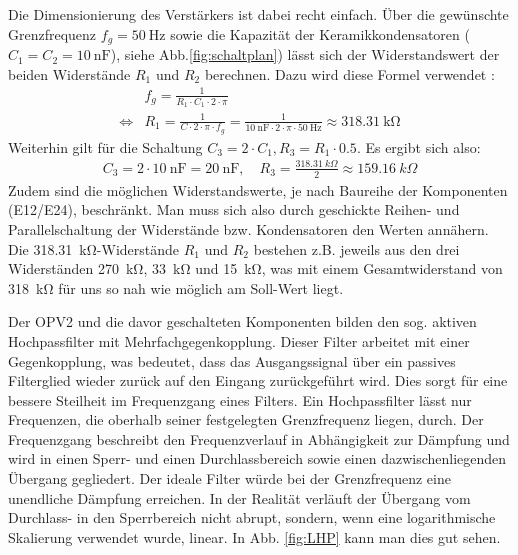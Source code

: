 \documentclass[10pt]{article}
\begin{document}
Die Dimensionierung des Verstärkers ist dabei recht einfach. 
Über die gewünschte Grenzfrequenz $f_g = \SI{50}{\hertz}$ sowie die Kapazität der Keramikkondensatoren ($C_1 = C_2 = \SI{10}{\nano\farad}$), siehe Abb.\ref{fig:schaltplan}) lässt sich der Widerstandswert der beiden Widerstände $R_1$ und $R_2$ berechnen.
Dazu wird diese Formel verwendet \cite{Notchfilter,Thomson}: %
%
\begin{align*}
                &f_g = \frac{1}{R_1 \cdot C_1 \cdot 2 \cdot \pi} \\
\Leftrightarrow &R_1 = \frac{1}{C \cdot 2 \cdot \pi \cdot f_g } = \frac{1}{\SI{10}{\nano\farad} \cdot 2 \cdot \pi \cdot \SI{50}{\hertz}} \approx \SI{318.31}{\kohm}     
\end{align*}
%
Weiterhin gilt für die Schaltung $C_3 = 2 \cdot C_1, R_3 = {R_1} \cdot 0.5$. Es ergibt sich also:
%
\begin{align*}
    C_3 = 2 \cdot \SI{10}{\nano\farad} = \SI{20}{\nano\farad}, \quad
    R_3 = \frac{\SI{318.31}{kΩ}}{2} \approx \SI{159.16}{kΩ} 
\end{align*}
Zudem sind die möglichen Widerstandswerte, je nach Baureihe der Komponenten (E12/E24), beschränkt. 
Man muss sich also durch geschickte Reihen- und Parallelschaltung der Widerstände bzw. Kondensatoren den Werten annähern. 
Die \SI{318,31}{kΩ}-Widerstände $R_1$ und $R_2$ bestehen z.B. jeweils aus den drei Widerständen \SI{270}{kΩ}, \SI{33}{kΩ} und \SI{15}{kΩ}, was mit einem Gesamtwiderstand von \SI{318}{\kohm} für uns so nah wie möglich am Soll-Wert liegt.

Der OPV2 und die davor geschalteten Komponenten bilden den sog. aktiven Hochpassfilter mit Mehrfachgegenkopplung. 
Dieser Filter arbeitet mit einer Gegenkopplung, was bedeutet, dass das Ausgangssignal über ein passives Filterglied wieder zurück auf den Eingang zurückgeführt wird. 
Dies sorgt für eine bessere Steilheit im Frequenzgang eines Filters. 
Ein Hochpassfilter lässt nur Frequenzen, die oberhalb seiner festgelegten Grenzfrequenz liegen, durch. 
Der Frequenzgang beschreibt den Frequenzverlauf in Abhängigkeit zur Dämpfung und wird in einen Sperr- und einen Durchlassbereich sowie einen dazwischenliegenden Übergang gegliedert. 
Der ideale Filter würde bei der Grenzfrequenz eine unendliche Dämpfung erreichen. 
In der Realität verläuft der Übergang vom Durchlass- in den Sperrbereich nicht abrupt, sondern, wenn eine logarithmische Skalierung verwendet wurde, linear.
In Abb. \ref{fig:LHP} kann man dies gut sehen.
\end{document}
